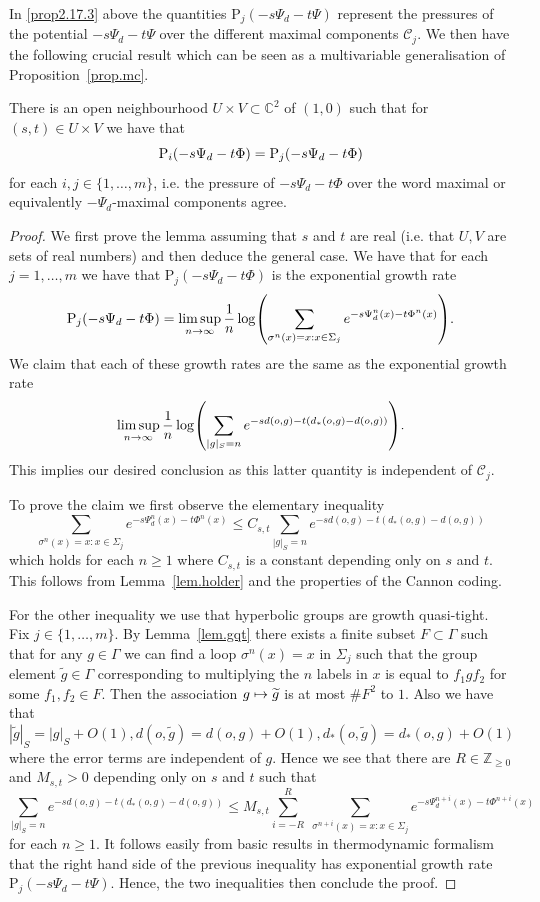 \documentclass[AHL,Unicode,longabstracts,published]{cedram}
\newcommand{\G}{\Gamma}
\renewcommand{\P}{\Psi}
\newcommand{\Cc}{\mathcal{C}}
\newcommand{\C}{\mathbb{C}}
\newcommand{\Z}{\mathbb{Z}}
\newcommand*\rmP{\mathrm{P}}
\let\originalleft\left
\let\originalright\right
\renewcommand{\left}{\mathopen{}\mathclose\bgroup\originalleft}
\renewcommand{\right}{\aftergroup\egroup\originalright}
\renewcommand*{\to}{\mathchoice{\longrightarrow}{\rightarrow}{\rightarrow}{\rightarrow}}
\let\oldmapsto\mapsto
\renewcommand*{\mapsto}{\mathchoice{\longmapsto}{\oldmapsto}{\oldmapsto}{\oldmapsto}}
\newcounter{setofcase}
\newcounter{case}[setofcase]
\theoremstyle{plain}
\newcommand{\G}{\Gamma}
\begin{document}
In \eqref{prop2.17.3} above the quantities $\rmP_j(-s\P_d - t \Psi)$ represent the pressures of the potential $-s\P_d - t \Psi$ over the different maximal components $\Cc_j$. We then have the following crucial result which can be seen as a multivariable generalisation of Proposition~\ref{prop.mc}.

\begin{lemm}\label{lem.pressagree}
There is an open neighbourhood $U \times V \subset \C^2$ of $(1,0)$ such that for\ $(s,t) \in U \times V$ we have that
\[
\rmP_i\left(-s\Psi_d - t\Phi\right) = \rmP_j\left(-s\Psi_d - t\Phi\right)
\]
for each $i,j \in \{1,\dots, m\}$, i.e. the pressure of $-s\Psi_d - t\Phi$ over the word maximal or equivalently $-\P_d$-maximal components agree.
\end{lemm}

\begin{proof}
We first prove the lemma assuming that $s$ and $t$ are real (i.e. that $U,V$ are sets of real numbers) and then deduce the general case. We have that for each $j = 1,\dots, m$ we have that $\rmP_j(-s\Psi_d - t\Phi)$ is the exponential growth rate
\[
\rmP_j(-s\Psi_d - t\Phi) = \limsup_{n\to\infty} \frac{1}{n} \log \left(\sum_{\sigma^{n}(x) = x: x \in \Sigma_j} e^{-s\Psi^n_d(x) - t\Phi^n(x)}\right).
\]
We claim that each of these growth rates are the same as the exponential growth rate
\[
\limsup_{n\to\infty} \frac{1}{n} \log \left(\sum_{|g|_S = n} e^{-sd(o,g) - t(d_\ast(o,g) - d(o,g))}\right).
\]
This implies our desired conclusion as this latter quantity is independent of $\Cc_j$.

To prove the claim we first observe the elementary inequality
\[
\sum_{\sigma^{n}(x) = x : x \in \Sigma_j} e^{-s\Psi^n_d(x) - t\Phi^n(x)} \le C_{s,t} \sum_{|g|_S = n} e^{-sd(o,g) - t(d_\ast(o,g) - d(o,g))}
\]
which holds for each $n\ge 1$ where $C_{s,t}$ is a constant depending only on $s$ and $t$. This follows from Lemma~\ref{lem.holder} and the properties of the Cannon coding.

For the other inequality we use that hyperbolic groups are growth quasi-tight. Fix $j \in \{1,\dots,m\}$. By Lemma~\ref{lem.gqt} there exists a finite subset $F \subset \Gamma$ such that for any $g \in \Gamma$ we can find a loop $\sigma^n(x) = x$ in $\Sigma_j$ such that the group element $\widetilde{g} \in\G$ corresponding to multiplying the $n$ labels in $x$ is equal to $f_1gf_2$ for some $f_1, f_2 \in F$. Then the association $g \mapsto \widetilde{g}$ is at most $\# F^2$ to $1$. Also we have that $|\widetilde{g}|_S = |g|_S + O(1), d(o,\widetilde{g}) = d(o,g) + O(1), d_\ast(o,\widetilde{g}) = d_\ast(o,g) + O(1)$ where the error terms are independent of $g$. Hence we see that there are $R \in \Z_{\ge 0}$ and $M_{s,t} >0$ depending only on $s$ and $t$ such that
\[
\sum_{|g|_S = n} e^{-sd(o,g) - t(d_\ast(o,g) - d(o,g))} \le M_{s,t} \sum_{i= -R}^R\; \sum_{\sigma^{n+i}(x) = x : x \in \Sigma_j} e^{-s\Psi^{n+i}_d(x) - t\Phi^{n+i}(x)}
\]
for each $n \ge 1$. It follows easily from basic results in thermodynamic formalism that the right hand side of the previous inequality has exponential growth rate $\rmP_j(-s\P_d - t\Psi)$. Hence, the two inequalities then conclude the proof.


\end{proof}
\end{document}
